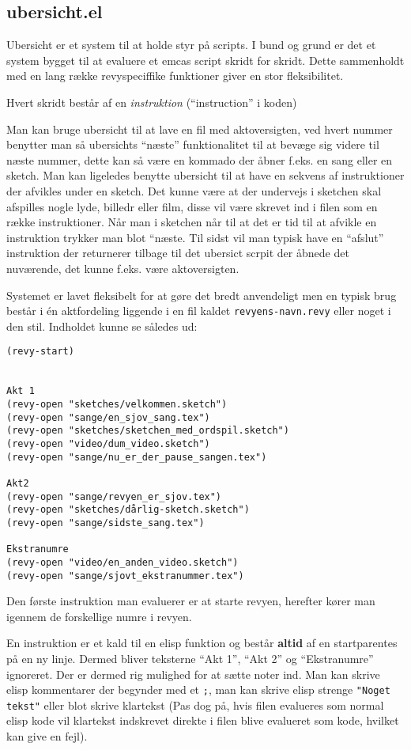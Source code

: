 \documentclass[10pt,a4paper,danish]{article}
\let\oldmarginnote\marginnote
\renewcommand{\marginnote}[1]{\oldmarginnote{\raggedright{}\footnotesize #1}}
\newcommand{\code}[1]{\colorbox{verbgray}{\texttt{#1}}}
\begin{document}
\subsection{ubersicht.el}
Ubersicht er et system til at holde styr på scripts. I bund og grund er det et
system bygget til at evaluere et emcas script skridt for skridt. Dette
sammenholdt med en lang række revyspeciffike funktioner giver en stor
fleksibilitet.

Hvert skridt består af en \textit{instruktion} (``instruction'' i koden)

Man kan bruge ubersicht til at lave en fil med aktoversigten, ved hvert nummer
benytter man så ubersichts ``næste'' funktionalitet til at bevæge sig videre til
næste nummer, dette kan så være en kommado der åbner f.eks. en sang eller en
sketch. Man kan ligeledes benytte ubersicht til at have en sekvens af
instruktioner der afvikles under en sketch. Det kunne være at der undervejs i
sketchen skal afspilles nogle lyde, billedr eller film, disse vil være skrevet
ind i filen som en række instruktioner. Når man i sketchen når til at det er tid
til at afvikle en instruktion trykker man blot ``næste. Til sidst vil man typisk
have en ``afslut'' instruktion der returnerer tilbage til det ubersict scrpit
der åbnede det nuværende, det kunne f.eks. være aktoversigten.

Systemet er lavet fleksibelt for at gøre det bredt anvendeligt men en typisk
brug består i én aktfordeling liggende i en fil kaldet \code{revyens-navn.revy}
eller noget i den stil. Indholdet kunne se således ud:

\begin{verbatim}
(revy-start)


Akt 1
(revy-open "sketches/velkommen.sketch")
(revy-open "sange/en_sjov_sang.tex")
(revy-open "sketches/sketchen_med_ordspil.sketch")
(revy-open "video/dum_video.sketch")
(revy-open "sange/nu_er_der_pause_sangen.tex")

Akt2
(revy-open "sange/revyen_er_sjov.tex")
(revy-open "sketches/dårlig-sketch.sketch")
(revy-open "sange/sidste_sang.tex")

Ekstranumre
(revy-open "video/en_anden_video.sketch")
(revy-open "sange/sjovt_ekstranummer.tex")
\end{verbatim}

Den første instruktion man evaluerer er at starte revyen, herefter kører man
igennem de forskellige numre i revyen.

En instruktion er et kald til en elisp funktion\marginnote{eller makro} og
består \textbf{altid} af en startparentes på en ny linje. Dermed bliver
teksterne ``Akt 1'', ``Akt 2'' og ``Ekstranumre'' ignoreret. Der er dermed rig
mulighed for at sætte noter ind. Man kan skrive elisp kommentarer der begynder
med et \code{;}, man kan skrive elisp strenge \code{"Noget
  tekst"} eller blot skrive klartekst (Pas dog på, hvis filen
evalueres som normal elisp kode vil klartekst indskrevet direkte i filen blive
evalueret som kode, hvilket kan give en fejl).\marginnote{Som i *-config.el}
\end{document}
